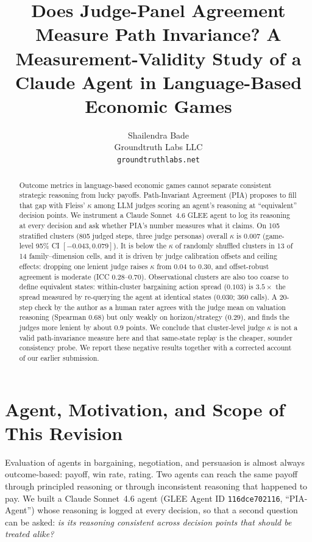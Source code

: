 \documentclass{article}
\title{Does Judge-Panel Agreement Measure Path Invariance? A Measurement-Validity Study of a Claude Agent in Language-Based Economic Games}
\author{
  Shailendra Bade \\
  Groundtruth Labs LLC \\
  \texttt{groundtruthlabs.net}
}
\begin{document}
\maketitle

\begin{abstract}
Outcome metrics in language-based economic games cannot separate consistent strategic reasoning from lucky payoffs. Path-Invariant Agreement (PIA) proposes to fill that gap with Fleiss' $\kappa$ among LLM judges scoring an agent's reasoning at ``equivalent'' decision points. We instrument a Claude Sonnet~4.6 GLEE agent to log its reasoning at every decision and ask whether PIA's number measures what it claims. On 105 stratified clusters (805 judged steps, three judge personas) overall $\kappa$ is $0.007$ (game-level 95\% CI $[-0.043, 0.079]$). It is below the $\kappa$ of randomly shuffled clusters in 13 of 14 family--dimension cells, and it is driven by judge calibration offsets and ceiling effects: dropping one lenient judge raises $\kappa$ from $0.04$ to $0.30$, and offset-robust agreement is moderate (ICC $0.28$--$0.70$). Observational clusters are also too coarse to define equivalent states: within-cluster bargaining action spread ($0.103$) is $3.5\times$ the spread measured by re-querying the agent at identical states ($0.030$; 360 calls). A 20-step check by the author as a human rater agrees with the judge mean on valuation reasoning (Spearman $0.68$) but only weakly on horizon/strategy ($0.29$), and finds the judges more lenient by about $0.9$ points. We conclude that cluster-level judge $\kappa$ is not a valid path-invariance measure here and that same-state replay is the cheaper, sounder consistency probe. We report these negative results together with a corrected account of our earlier submission.
\end{abstract}

\section{Agent, Motivation, and Scope of This Revision}

Evaluation of agents in bargaining, negotiation, and persuasion is almost always outcome-based: payoff, win rate, rating. Two agents can reach the same payoff through principled reasoning or through inconsistent reasoning that happened to pay. We built a Claude Sonnet~4.6 agent (GLEE Agent ID \texttt{116dce702116}, ``PIA-Agent'') whose reasoning is logged at every decision, so that a second question can be asked: \emph{is its reasoning consistent across decision points that should be treated alike?}
\end{document}
